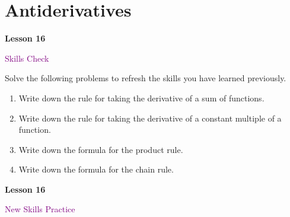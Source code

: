 \documentclass[10pt]{book}
\theoremstyle{definition}
\theoremstyle{remark}
\begin{document}
\section{Antiderivatives}
\begin{tcolorbox}[
  width=\textwidth,
  colback=gray!10, %
  colframe=white, %
  boxrule=0pt,    %
  left=1cm,       %
  right=1cm,      %
  sharp corners  %
]

\begin{minipage}[t]{0.5\textwidth}
  \Huge \textbf{Lesson 16}
\end{minipage}%
\hfill
\begin{minipage}[t]{0.5\textwidth}
  \Huge \textcolor{purple}{Skills Check}
\end{minipage}
\end{tcolorbox}

\begin{large}
\noindent
Solve the following problems to refresh the skills you have learned previously.
\begin{enumerate}
\item Write down the rule for taking the derivative of a sum of functions. \vfil \vfil \vfil
\item Write down the rule for taking the derivative of a constant multiple of a function.\vfil \vfil\vfil
\item Write down the formula for the product rule. \vfil \vfil \vfil
\item Write down the formula for the chain rule.\vfil \vfil \vfil
\end{enumerate}
\end{large}
\newpage


\begin{tcolorbox}[
  width=\textwidth,
  colback=gray!10, %
  colframe=white, %
  boxrule=0pt,    %
  left=1cm,       %
  right=1cm,      %
  sharp corners  %
]

\begin{minipage}[t]{0.5\textwidth}
  \Huge \textbf{Lesson 16}
\end{minipage}%
\hfill
\begin{minipage}[t]{0.5\textwidth}
  \Huge\textcolor{purple}{New Skills Practice}
\end{minipage}
\end{tcolorbox}
\end{document}
